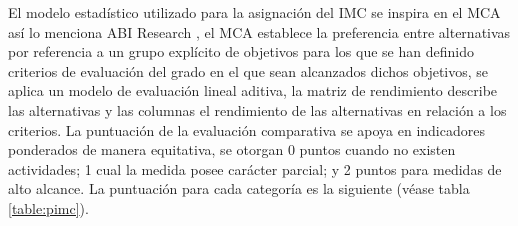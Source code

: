 \documentclass[runningheads,a4paper]{llncs}
\begin{document}
El modelo estadístico utilizado para la asignación del \gls{IMC} se inspira en el \gls{MCA} así lo menciona ABI Research \cite{GCSI_1}, el \gls{MCA} establece la preferencia entre alternativas por referencia a un grupo explícito de objetivos para los que se han definido criterios de evaluación del grado en el que sean alcanzados dichos objetivos, se aplica un modelo de evaluación lineal aditiva, la matriz de rendimiento describe las alternativas y las columnas el rendimiento de las alternativas en relación a los criterios. La puntuación de la evaluación comparativa se apoya en indicadores ponderados de manera equitativa, se otorgan 0 puntos cuando no existen actividades; 1 cual la medida posee carácter parcial; y 2 puntos para medidas de alto alcance. La puntuación para cada categoría es la siguiente (véase tabla \ref{table:pimc}).  
\end{document}
